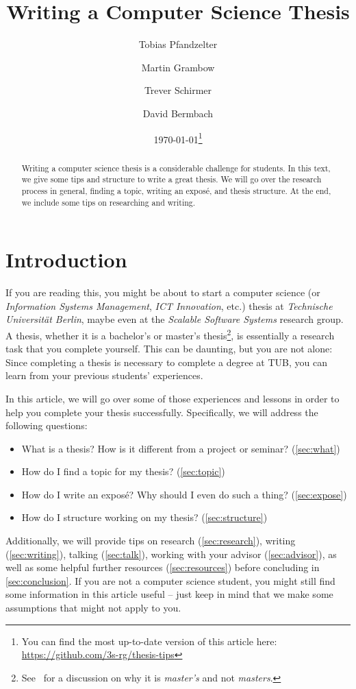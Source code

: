 \documentclass[a4paper]{article}
\title{Writing a Computer Science Thesis}
\author{Tobias Pfandzelter}
\author{Martin Grambow}
\author{Trever Schirmer}
\author{David Bermbach}
\affil{Scalable Software Systems Research Group\\Technische Universit\"at Berlin \& Einstein Center Digital Future\\Berlin, Germany\\\texttt{\{tp,mg,ts,db\}@3s.tu-berlin.de}}
\date{\today\footnote{You can find the most up-to-date version of this article here: \url{https://github.com/3s-rg/thesis-tips}}}
\begin{document}
\maketitle
\begin{abstract}
    Writing a computer science thesis is a considerable challenge for students.
    In this text, we give some tips and structure to write a great thesis.
    We will go over the research process in general, finding a topic, writing an expos\'e, and thesis structure.
    At the end, we include some tips on researching and writing.
\end{abstract}

\section{Introduction}
\label{sec:introduction}

If you are reading this, you might be about to start a computer science (or \emph{Information Systems Management}, \emph{ICT Innovation}, etc.) thesis at \emph{Technische Universit\"at Berlin}, maybe even at the \emph{Scalable Software Systems} research group.
A thesis, whether it is a bachelor's or master's thesis\footnote{See~\cite{masters-apostrophe-as} for a discussion on why it is \emph{master's} and not \emph{masters}.}, is essentially a research task that you complete yourself.
This can be daunting, but you are not alone: Since completing a thesis is necessary to complete a degree at TUB, you can learn from your previous students' experiences.

In this article, we will go over some of those experiences and lessons in order to help you complete your thesis successfully.
Specifically, we will address the following questions:

\begin{itemize}
    \item What is a thesis? How is it different from a project or seminar? (\cref{sec:what})
    \item How do I find a topic for my thesis? (\cref{sec:topic})
    \item How do I write an expos\'e? Why should I even do such a thing? (\cref{sec:expose})
    \item How do I structure working on my thesis? (\cref{sec:structure})
\end{itemize}

Additionally, we will provide tips on research (\cref{sec:research}), writing (\cref{sec:writing}), talking (\cref{sec:talk}), working with your advisor (\cref{sec:advisor}), as well as some helpful further resources (\cref{sec:resources}) before concluding in \cref{sec:conclusion}.
If you are not a computer science student, you might still find some information in this article useful -- just keep in mind that we make some assumptions that might not apply to you.
\end{document}
